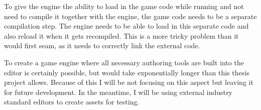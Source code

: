 To give the engine the ability to load in the game code while running and not need to compile it together with the engine, the game code needs to be a separate compilation step. The engine needs to be able to load in this separate code and also reload it when it gets recompiled. This is a more tricky problem than it would first seam, as it needs to correctly link the external code.

To create a game engine where all necessary authoring tools are built into the editor is certainly possible, but would take exponentially longer than this thesis project allows. Because of this I will be not focusing on this aspect but leaving it for future development. In the meantime, I will be using external industry standard editors to create assets for testing.